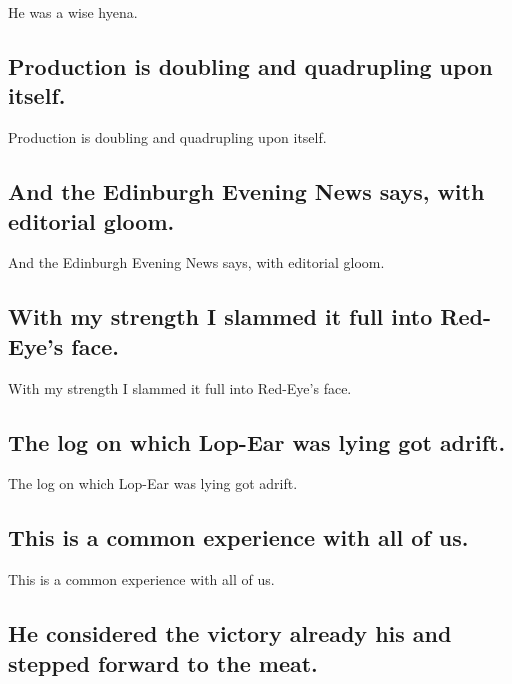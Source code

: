 \documentclass[]{article}
\begin{document}
He was a wise hyena.

\hypertarget{production-is-doubling-and-quadrupling-upon-itself.}{%
\subsection{Production is doubling and quadrupling upon
itself.}\label{production-is-doubling-and-quadrupling-upon-itself.}}

Production is doubling and quadrupling upon itself.

\hypertarget{and-the-edinburgh-evening-news-says-with-editorial-gloom.}{%
\subsection{And the Edinburgh Evening News says, with editorial
gloom.}\label{and-the-edinburgh-evening-news-says-with-editorial-gloom.}}

And the Edinburgh Evening News says, with editorial gloom.

\hypertarget{with-my-strength-i-slammed-it-full-into-red-eyes-face.}{%
\subsection{With my strength I slammed it full into Red-Eye's
face.}\label{with-my-strength-i-slammed-it-full-into-red-eyes-face.}}

With my strength I slammed it full into Red-Eye's face.

\hypertarget{the-log-on-which-lop-ear-was-lying-got-adrift.}{%
\subsection{The log on which Lop-Ear was lying got
adrift.}\label{the-log-on-which-lop-ear-was-lying-got-adrift.}}

The log on which Lop-Ear was lying got adrift.

\hypertarget{this-is-a-common-experience-with-all-of-us.}{%
\subsection{This is a common experience with all of
us.}\label{this-is-a-common-experience-with-all-of-us.}}

This is a common experience with all of us.

\hypertarget{he-considered-the-victory-already-his-and-stepped-forward-to-the-meat.}{%
\subsection{He considered the victory already his and stepped forward to
the
meat.}\label{he-considered-the-victory-already-his-and-stepped-forward-to-the-meat.}}
\end{document}
